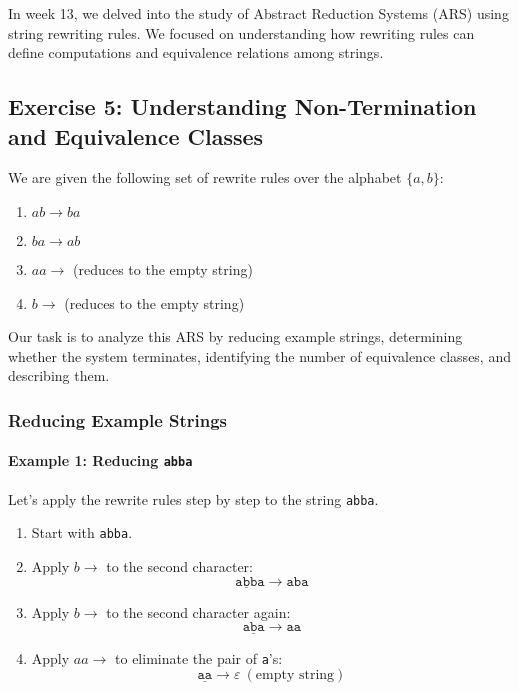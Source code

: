 \documentclass{article}
\begin{document}
In week 13, we delved into the study of Abstract Reduction Systems (ARS) using string rewriting rules. We focused on understanding how rewriting rules can define computations and equivalence relations among strings. 

\subsection*{Exercise 5: Understanding Non-Termination and Equivalence Classes}

We are given the following set of rewrite rules over the alphabet $\{a, b\}$:

\begin{enumerate}
    \item $ab \to ba$
    \item $ba \to ab$
    \item $aa \to$ (reduces to the empty string)
    \item $b \to$ (reduces to the empty string)
\end{enumerate}

Our task is to analyze this ARS by reducing example strings, determining whether the system terminates, identifying the number of equivalence classes, and describing them.

\subsubsection*{Reducing Example Strings}

\paragraph{Example 1: Reducing \texttt{abba}}

Let's apply the rewrite rules step by step to the string \texttt{abba}.

\begin{enumerate}
    \item Start with \texttt{abba}.
    \item Apply $b \to$ to the second character:
    \begin{equation*}
        \texttt{a}\underline{\texttt{b}}\texttt{ba} \to \texttt{aba}
    \end{equation*}
    \item Apply $b \to$ to the second character again:
    \begin{equation*}
        \texttt{a}\underline{\texttt{b}}\texttt{a} \to \texttt{aa}
    \end{equation*}
    \item Apply $aa \to$ to eliminate the pair of \texttt{a}'s:
    \begin{equation*}
        \underline{\texttt{aa}} \to \varepsilon \ (\text{empty string})
    \end{equation*}
\end{enumerate}
\end{document}
